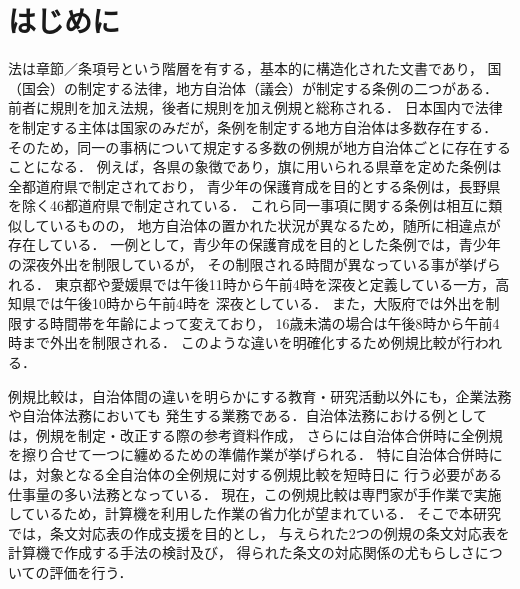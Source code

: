 \documentclass[japanese]{jnlp_1.4}
\begin{document}
\maketitle

\section{はじめに}\label{sec:hajimeni}


法は章節／条項号という階層を有する，基本的に構造化された文書であり，
国（国会）の制定する法律，地方自治体（議会）が制定する条例の二つがある．
前者に規則を加え法規，後者に規則を加え例規と総称される．
日本国内で法律を制定する主体は国家のみだが，条例を制定する地方自治体は多数存在する．
そのため，同一の事柄について規定する多数の例規が地方自治体ごとに存在することになる．
例えば，各県の象徴であり，旗に用いられる県章を定めた条例は全都道府県で制定されており，
青少年の保護育成を目的とする条例は，長野県を除く46都道府県で制定されている．
これら同一事項に関する条例は相互に類似しているものの，
地方自治体の置かれた状況が異なるため，随所に相違点が存在している．
一例として，青少年の保護育成を目的とした条例では，青少年の深夜外出を制限しているが，
その制限される時間が異なっている事が挙げられる．
東京都や愛媛県では午後11時から午前4時を深夜と定義している一方，高知県では午後10時から午前4時を
深夜としている．
また，大阪府では外出を制限する時間帯を年齢によって変えており，
16歳未満の場合は午後8時から午前4時まで外出を制限される．
このような違いを明確化するため例規比較が行われる．

例規比較は，自治体間の違いを明らかにする教育・研究活動以外にも，企業法務や自治体法務においても
発生する業務である．自治体法務における例としては，例規を制定・改正する際の参考資料作成，
さらには自治体合併時に全例規を擦り合せて一つに纏めるための準備作業が挙げられる．
特に自治体合併時には，対象となる全自治体の全例規に対する例規比較を短時日に
行う必要がある仕事量の多い法務となっている\cite{加藤幸嗣:2006-05,伊佐美浩一:2005-05,伊佐美浩一:2005-08,藤井真知子:2007-07-31}．
現在，この例規比較は専門家が手作業で実施しているため，計算機を利用した作業の省力化が望まれている．
そこで本研究では，条文対応表の作成支援を目的とし，
与えられた2つの例規の条文対応表を計算機で作成する手法の検討及び，
得られた条文の対応関係の尤もらしさについての評価を行う．
\end{document}

